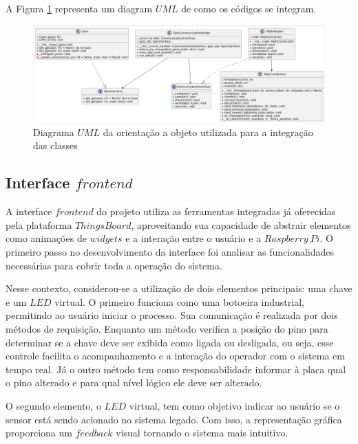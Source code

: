 \documentclass{ecatfg}
\begin{document}
A Figura \ref{fig:diagrama_uml_gpio_communication} representa um diagram $UML$ de como os códigos se integram.\par
\begin{figure}[!htb]
    \centering
    \includegraphics[scale=0.17]{Figuras/diagrama_uml_gpio_communication.png}
    \caption{Diagrama $UML$ da orientação a objeto utilizada para a integração das classes}
    \label{fig:diagrama_uml_gpio_communication}
\end{figure}

\subsection{Interface $frontend$}

A interface $frontend$ do projeto utiliza as ferramentas integradas já oferecidas pela plataforma $ThingsBoard$, aproveitando sua capacidade de abstrair elementos como animações de $widgets$ e a interação entre o usuário e a $Raspberry\ Pi$. O primeiro passo no desenvolvimento da interface foi analisar as funcionalidades necessárias para cobrir toda a operação do sistema. \par

Nesse contexto, considerou-se a utilização de dois elementos principais: uma chave e um $LED$ virtual. O primeiro funciona como uma botoeira industrial, permitindo ao usuário iniciar o processo. Sua comunicação é realizada por dois métodos de requisição. Enquanto um método verifica a posição do pino para determinar se a chave deve ser exibida como ligada ou desligada, ou seja, esse controle facilita o acompanhamento e a interação do operador com o sistema em tempo real. Já o outro método tem como responsabilidade informar à placa qual o pino alterado e para qual nível lógico ele deve ser alterado.\par

O segundo elemento, o $LED$ virtual, tem como objetivo indicar ao usuário se o sensor está sendo acionado no sistema legado. Com isso, a representação gráfica proporciona um $feedback$ visual tornando o sistema mais intuitivo. \par 
\end{document}
